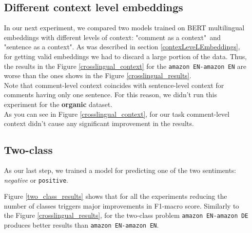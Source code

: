 \subsection{Different context level embeddings}
In our next experiment, we compared two models trained on BERT multilingual embeddings with different levels of context: "comment as a context"\ and "sentence as a context". As was described in section \ref{contexLeveLEmbeddings}, for getting valid embeddings we had to discard a large portion of the data. Thus, the results in the Figure \ref{crosslingual_context} for the {\tt amazon EN-amazon EN} are worse than the ones shows in the Figure \ref{crosslingual_results}. \\
Note that comment-level context coincides with sentence-level context for comments having only one sentence. For this reason, we didn't run this experiment for the {\bf organic} dataset. \\
As you can see in Figure \ref{crosslingual_context}, for our task comment-level context didn't cause any significant improvement in the results. \\


\subsection{Two-class}
As our last step, we trained a model for predicting one of the two sentiments: {\it negative} or {\tt positive}. 

Figure \ref{two_class_results} shows that for all the experiments reducing the number of classes triggers major improvements in F1-macro score. Similarly to the Figure \ref{crosslingual_results}, for the two-class problem {\tt amazon EN-amazon DE} produces better results than {\tt amazon EN-amazon EN}.